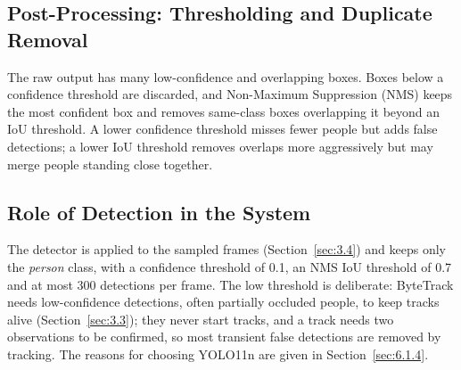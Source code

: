 \subsection{Post-Processing: Thresholding and Duplicate Removal}
\label{sec:3.2.4}

The raw output has many low-confidence and overlapping boxes. Boxes below a confidence threshold are discarded, and Non-Maximum Suppression (NMS) keeps the most confident box and removes same-class boxes overlapping it beyond an IoU threshold. A lower confidence threshold misses fewer people but adds false detections; a lower IoU threshold removes overlaps more aggressively but may merge people standing close together.

\subsection{Role of Detection in the System}
\label{sec:3.2.5}

The detector is applied to the sampled frames (Section~\ref{sec:3.4}) and keeps only the \emph{person} class, with a confidence threshold of 0.1, an NMS IoU threshold of 0.7 and at most 300 detections per frame. The low threshold is deliberate: ByteTrack needs low-confidence detections, often partially occluded people, to keep tracks alive (Section~\ref{sec:3.3}); they never start tracks, and a track needs two observations to be confirmed, so most transient false detections are removed by tracking. The reasons for choosing YOLO11n are given in Section~\ref{sec:6.1.4}.
